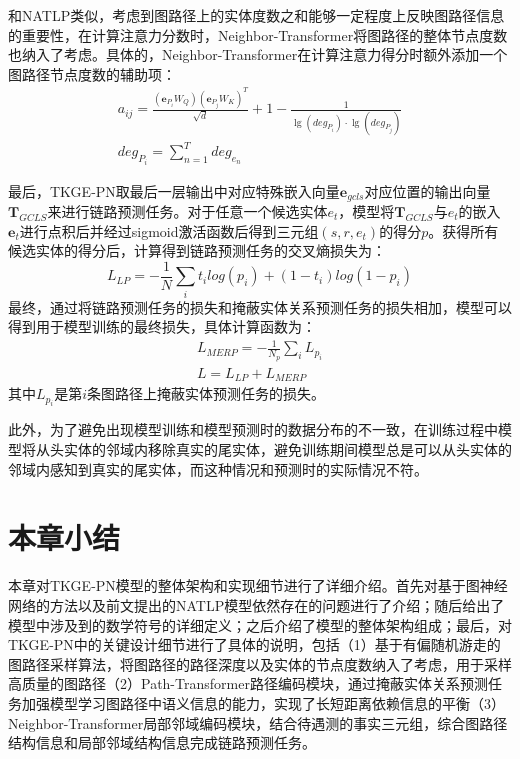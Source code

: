 和NATLP类似，考虑到图路径上的实体度数之和能够一定程度上反映图路径信息的重要性，在计算注意力分数时，Neighbor-Transformer将图路径的整体节点度数也纳入了考虑。具体的，Neighbor-Transformer在计算注意力得分时额外添加一个图路径节点度数的辅助项：
\begin{gather}
  a_{ij}=\frac{(\boldsymbol{e}_{P_i}W_Q)(\boldsymbol{e}_{P_j}W_K)^T}{\sqrt{d}}+1-\frac{1}{\lg (deg_{P_i})\cdot \lg (deg_{P_j})}\\
  deg_{P_i}=\sum_{n = 1}^{T}  deg_{e_n}
\end{gather}

最后，TKGE-PN取最后一层输出中对应特殊嵌入向量$\boldsymbol{e}_{gcls}$对应位置的输出向量$\boldsymbol{T}_{GCLS}$来进行链路预测任务。对于任意一个候选实体$e_t$，模型将$\boldsymbol{T}_{GCLS}$与$e_t$的嵌入$\boldsymbol{e}_{t}$进行点积后并经过sigmoid激活函数后得到三元组$(s,r,e_t)$的得分$p$。获得所有候选实体的得分后，计算得到链路预测任务的交叉熵损失为：
\begin{equation}
  L_{LP} = -\frac{1}{N}\sum\limits_{i}t_ilog(p_i)+(1-t_i)log(1-p_i)
\end{equation}
最终，通过将链路预测任务的损失和掩蔽实体关系预测任务的损失相加，模型可以得到用于模型训练的最终损失，具体计算函数为：
\begin{gather}
  L_{MERP} = -\frac{1}{N_p}\sum\limits_{i}L_{p_{i}}\\
  L=L_{LP}+L_{MERP}
\end{gather}
其中$L_{p_{i}}$是第$i$条图路径上掩蔽实体预测任务的损失。

此外，为了避免出现模型训练和模型预测时的数据分布的不一致，在训练过程中模型将从头实体的邻域内移除真实的尾实体，避免训练期间模型总是可以从头实体的邻域内感知到真实的尾实体，而这种情况和预测时的实际情况不符。


\section{本章小结}

本章对TKGE-PN模型的整体架构和实现细节进行了详细介绍。首先对基于图神经网络的方法以及前文提出的NATLP模型依然存在的问题进行了介绍；随后给出了模型中涉及到的数学符号的详细定义；之后介绍了模型的整体架构组成；最后，对TKGE-PN中的关键设计细节进行了具体的说明，包括（1）基于有偏随机游走的图路径采样算法，将图路径的路径深度以及实体的节点度数纳入了考虑，用于采样高质量的图路径（2）Path-Transformer路径编码模块，通过掩蔽实体关系预测任务加强模型学习图路径中语义信息的能力，实现了长短距离依赖信息的平衡（3）Neighbor-Transformer局部邻域编码模块，结合待遇测的事实三元组，综合图路径结构信息和局部邻域结构信息完成链路预测任务。
